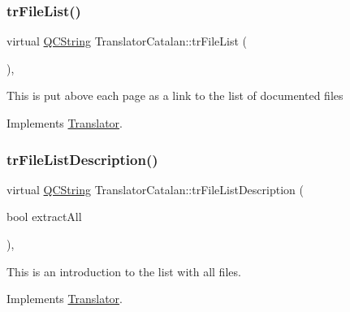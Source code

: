 \mbox{\label{class_translator_catalan_a78158239235bd6d47ed412d70e6067c9}} 
\subsubsection{\texorpdfstring{trFileList()}{trFileList()}}
{\footnotesize\ttfamily virtual \mbox{\hyperlink{class_q_c_string}{Q\+C\+String}} Translator\+Catalan\+::tr\+File\+List (\begin{DoxyParamCaption}{ }\end{DoxyParamCaption})\hspace{0.3cm}{\ttfamily [inline]}, {\ttfamily [virtual]}}

This is put above each page as a link to the list of documented files 

Implements \mbox{\hyperlink{class_translator}{Translator}}.

\mbox{\label{class_translator_catalan_a18fd00ad55691e3a4d6b040429ee26c1}} 
\subsubsection{\texorpdfstring{trFileListDescription()}{trFileListDescription()}}
{\footnotesize\ttfamily virtual \mbox{\hyperlink{class_q_c_string}{Q\+C\+String}} Translator\+Catalan\+::tr\+File\+List\+Description (\begin{DoxyParamCaption}\item[{bool}]{extract\+All }\end{DoxyParamCaption})\hspace{0.3cm}{\ttfamily [inline]}, {\ttfamily [virtual]}}

This is an introduction to the list with all files. 

Implements \mbox{\hyperlink{class_translator}{Translator}}.

\mbox{\label{class_translator_catalan_aefab2969a9fd4b51ff110a652bd9044f}} 
